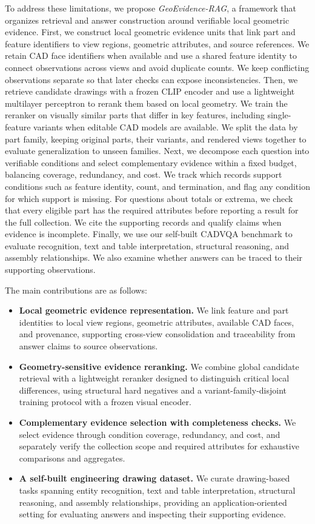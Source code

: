 \documentclass[preprint,12pt]{elsarticle}
\begin{document}
To address these limitations, we propose \textit{GeoEvidence-RAG}, a framework that organizes retrieval and answer construction around verifiable local geometric evidence.
First, we construct local geometric evidence units that link part and feature identifiers to view regions, geometric attributes, and source references. We retain CAD face identifiers when available and use a shared feature identity to connect observations across views and avoid duplicate counts. We keep conflicting observations separate so that later checks can expose inconsistencies.
Then, we retrieve candidate drawings with a frozen CLIP encoder and use a lightweight multilayer perceptron to rerank them based on local geometry. We train the reranker on visually similar parts that differ in key features, including single-feature variants when editable CAD models are available. We split the data by part family, keeping original parts, their variants, and rendered views together to evaluate generalization to unseen families.
Next, we decompose each question into verifiable conditions and select complementary evidence within a fixed budget, balancing coverage, redundancy, and cost. We track which records support conditions such as feature identity, count, and termination, and flag any condition for which support is missing. For questions about totals or extrema, we check that every eligible part has the required attributes before reporting a result for the full collection. We cite the supporting records and qualify claims when evidence is incomplete.
Finally, we use our self-built CADVQA benchmark to evaluate recognition, text and table interpretation, structural reasoning, and assembly relationships. We also examine whether answers can be traced to their supporting observations.

The main contributions are as follows:
\begin{itemize}[leftmargin=*,itemsep=0.45em]
\item \textbf{Local geometric evidence representation.}
We link feature and part identities to local view regions, geometric attributes, available CAD faces, and provenance, supporting cross-view consolidation and traceability from answer claims to source observations.
\item \textbf{Geometry-sensitive evidence reranking.}
We combine global candidate retrieval with a lightweight reranker designed to distinguish critical local differences, using structural hard negatives and a variant-family-disjoint training protocol with a frozen visual encoder.
\item \textbf{Complementary evidence selection with completeness checks.}
We select evidence through condition coverage, redundancy, and cost, and separately verify the collection scope and required attributes for exhaustive comparisons and aggregates.
\item \textbf{A self-built engineering drawing dataset.}
We curate drawing-based tasks spanning entity recognition, text and table interpretation, structural reasoning, and assembly relationships, providing an application-oriented setting for evaluating answers and inspecting their supporting evidence.
\end{itemize}
\end{document}
